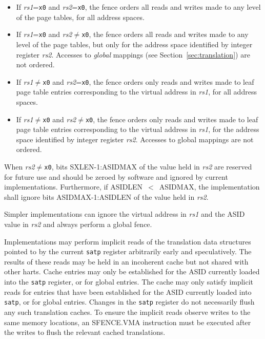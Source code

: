\begin{itemize}
\item If {\em rs1}={\tt x0} and {\em rs2}={\tt x0}, the fence orders all
      reads and writes made to any level of the page tables, for all
      address spaces.
\item If {\em rs1}={\tt x0} and {\em rs2}$\neq${\tt x0}, the fence orders
      all reads and writes made to any level of the page tables, but only
      for the address space identified by integer register {\em rs2}.
      Accesses to {\em global} mappings (see Section~\ref{sec:translation})
      are not ordered.
\item If {\em rs1}$\neq${\tt x0} and {\em rs2}={\tt x0}, the fence orders
      only reads and writes made to leaf page table entries corresponding
      to the virtual address in {\em rs1}, for all address spaces.
\item If {\em rs1}$\neq${\tt x0} and {\em rs2}$\neq${\tt x0}, the fence
      orders only reads and writes made to leaf page table entries
      corresponding to the virtual address in {\em rs1}, for the address
      space identified by integer register {\em rs2}.
      Accesses to global mappings are not ordered.
\end{itemize}

When {\em rs2}$\neq${\tt x0}, bits SXLEN-1:ASIDMAX of the value held in {\em
rs2} are reserved for future use and should be zeroed by software and ignored
by current implementations.  Furthermore, if ASIDLEN~$<$~ASIDMAX, the
implementation shall ignore bits ASIDMAX-1:ASIDLEN of the value held in {\em
rs2}.

\begin{commentary}
Simpler implementations can ignore the virtual address in {\em rs1} and
the ASID value in {\em rs2} and always perform a global fence.
\end{commentary}

Implementations may perform implicit reads of the translation data structures
pointed to by the current {\tt satp} register arbitrarily early and
speculatively.  The results of these reads may be held in an incoherent cache
but not shared with other harts.  Cache entries may only be established for
the ASID currently loaded into the {\tt satp} register, or for global entries.
The cache may only satisfy implicit reads for entries that have been
established for the ASID currently loaded into {\tt satp}, or for global
entries.  Changes in the {\tt satp} register do not necessarily flush any such
translation caches.  To ensure the implicit reads observe writes to the same
memory locations, an SFENCE.VMA instruction must be executed after the writes
to flush the relevant cached translations.

